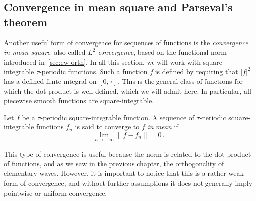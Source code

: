 \subsection{Convergence in mean square and Parseval's theorem}
Another useful form of convergence for sequences of functions is the \emph{convergence in mean square}, also called \emph{$L^2$ convergence}, based on the functional norm introduced in~\cref{sec:ew-orth}. In all this section, we will work with square-integrable $\tau$-periodic functions. Such a function $f$ is defined by requiring that $|f|^2$ has a defined finite integral on $[0,\tau]$. This is the general class of functions for which the dot product is well-defined, which we will admit here. In particular, all piecewise smooth functions are square-integrable.
\begin{definition}
  Let $f$ be a $\tau$-periodic square-integrable function. A sequence of $\tau$-periodic square-integrable functions $f_n$ is said to converge to $f$ \emph{in mean} if
  \begin{equation}
    \lim_{n\to+\infty}\|f-f_n\|=0\,.
  \end{equation}
\end{definition}
This type of convergence is useful because the norm is related to the dot product of functions,
and as we saw in the previous chapter, the orthogonality of elementary waves. However, it is important to notice that this is a rather weak form of convergence, and without further assumptions it does not generally imply pointwise or uniform convergence.

